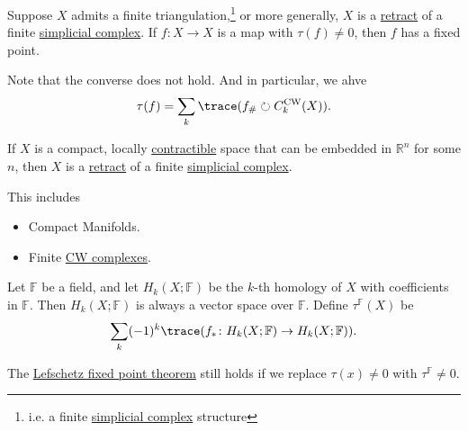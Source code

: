 \begin{theorem}\label{thm:Lefschetz-fixed-point}
	Suppose \(X\) admits a finite triangulation,\footnote{i.e. a finite \hyperref[def:simplicial-complex]{simplicial complex} structure}
	or more generally, \(X\) is a \hyperref[def:retraction]{retract} of a finite \hyperref[def:simplicial-complex]{simplicial complex}.
	If \(f \colon X \to X\) is a map with \(\tau(f) \neq 0\), then \(f\) has a fixed point.
\end{theorem}
\begin{note}
	Note that the converse does not hold. And in particular, we ahve
	\[
		\tau (f) = \sum\limits_{k} \trace(f_\# \circlearrowright C^{\mathrm{CW}}_k(X) ).
	\]
\end{note}
\begin{theorem}\label{thm:retract-simplicial-complex}
	If \(X\) is a compact, locally \hyperref[def:contractible]{contractible} space that can be embedded in \(\mathbb{R}^n\) for some \(n\), then \(X\) is a
	\hyperref[def:retraction]{retract} of a finite \hyperref[def:simplicial-complex]{simplicial complex}.
\end{theorem}
\begin{remark}
	This includes
	\begin{itemize}
		\item Compact Manifolds.
		\item Finite \hyperref[def:CW-Complex]{CW complexes}.
	\end{itemize}
\end{remark}
\begin{definition}\label{def:Lefschetz-number-better}
	Let \(\mathbb{F}\) be a field, and let \(H_k(X; \mathbb{F})\) be the \(k\)-th homology of \(X\) with coefficients in \(\mathbb{F}\).
	Then \(H_k(X; \mathbb{F})\) is always a vector space over \(\mathbb{F}\). Define \(\tau^{\mathbb{F}}(X)\) be
	\[
		\sum_k (-1)^k \trace(f_\ast \colon H_k(X; \mathbb{F}) \to H_k(X; \mathbb{F})).
	\]
\end{definition}
\begin{remark}
	The \hyperref[thm:Lefschetz-fixed-point]{Lefschetz fixed point theorem} still holds if we replace \(\tau(x) \neq 0\) with \(\tau^{\mathbb{F}} \neq 0\).
\end{remark}
